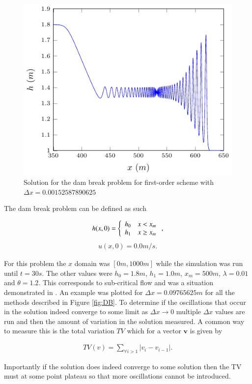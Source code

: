 \documentclass[SingleSpace,12pt]{Serre_ASCE}
\begin{document}
\begin{figure}[htb]
\centering
\includegraphics[width=15.0cm]{./results/dambreak/ex/o1-figure1.pdf}
\caption{Solution for the dam break problem for first-order scheme with $\Delta x = 0.00152587890625$}
\label{fig:DB1o1}
\end{figure}
The dam break problem can be defined as such
\begin{linenomath*}
\begin{gather}
h(x,0) = \left\lbrace \begin{array}{c c}
h_0 & x < x_m\\
h_1 & x \ge x_m\\
\end{array} \right. ,
\end{gather}
\begin{gather}
u(x,0) = 0.0m/s.
\end{gather}
\end{linenomath*}
For this problem the $x$ domain was $\left[0m,1000m\right]$ while the simulation was run until $t=30s$. The other values were $h_0 = 1.8m$, $h_1 = 1.0m$, $x_m = 500m$, $\lambda = 0.01$ and $\theta = 1.2$. This corresponds to sub-critical flow and was a situation demonstrated in \cite{El-etal-2006,Hank-etal-2010-2034}. An example was plotted for $\Delta x = 0.09765625m$ for all the methods described in Figure \ref{fig:DB}. To determine if the oscillations that occur in the solution indeed converge to some limit as $\Delta x \rightarrow 0$ multiple $\Delta x$ values are run and then the amount of variation in the solution measured. A common way to measure this is the total variation $TV$ \cite{LeVeque-2002} which for a vector $\boldsymbol{v}$ is given by
\begin{linenomath*}
\begin{gather}
TV(v) = \sum_{\forall i >1} |v_{i} - v_{i-1}|.
\end{gather}
\end{linenomath*}
Importantly if the solution does indeed converge to some solution then the TV must at some point plateau so that more oscillations cannot be introduced.
\end{document}
